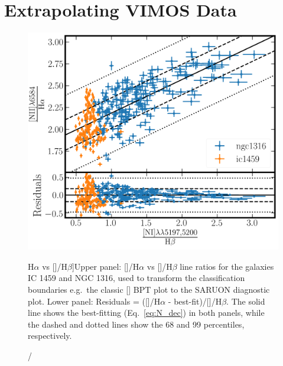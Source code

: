 \documentclass[a4paper,fleqn,usenatbib]{mnras}
\newcommand{\bracket}[1]{[#1]} %
\begin{document}
\section{Extrapolating VIMOS Data}
	\label{sec:Decrement}
	\begin{figure}
		\includegraphics[width=\columnwidth]{ratio_fit.png}
		\caption[\bracket{}/H$\alpha$ vs \bracket{}/H$\beta$]{Upper panel: []/H$\alpha$ vs []/H$\beta$ line ratios for the galaxies IC 1459 and NGC 1316, used to transform the classification boundaries e.g.\ the classic [] BPT plot to the SARUON diagnostic plot. Lower panel: Residuals = ([]/H$\alpha$ - best-fit)/[]/H$\beta$. The solid line shows the best-fitting (Eq.\ \ref{eq:N_dec}) in both panels, while the dashed and dotted lines show the 68 and 99 percentiles, respectively.}
		\label{fig:ratio_relation}
	\end{figure}
\end{document}
